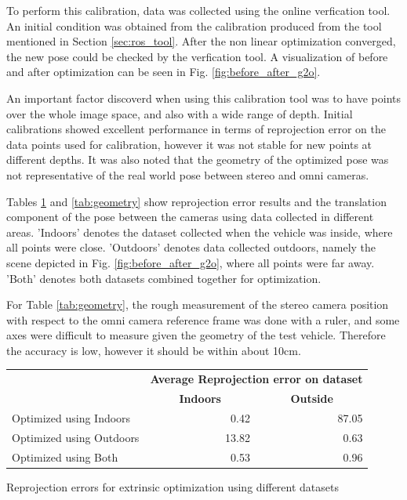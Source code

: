 To perform this calibration, data was collected using the online verfication tool.  An initial condition was obtained from the calibration produced from the tool mentioned in Section \ref{sec:ros_tool}.  After the non linear optimization converged, the new pose could be checked by the verfication tool.  A visualization of before and after optimization can be seen in Fig. \ref{fig:before_after_g2o}. 

An important factor discoverd when using this calibration tool was to have points over the whole image space, and also with a wide range of depth.  Initial calibrations showed excellent performance in terms of reprojection error on the data points used for calibration, however it was not stable for new points at different depths.  It was also noted that the geometry of the optimized pose was not representative of the real world pose between stereo and omni cameras.  

Tables \ref{tab:reprojection_error} and \ref{tab:geometry} show reprojection error results and the translation component of the pose between the cameras using data collected in different areas. 'Indoors' denotes the dataset collected when the vehicle was inside, where all points were close. 'Outdoors' denotes data collected outdoors, namely the scene depicted in Fig. \ref{fig:before_after_g2o}, where all points were far away.  'Both' denotes both datasets combined together for optimization.

For Table \ref{tab:geometry}, the rough measurement of the stereo camera position with respect to the omni camera reference frame was done with a ruler, and some axes were difficult to measure given the geometry of the test vehicle.  Therefore the accuracy is low, however it should be within about 10cm.

\begin{table}[H]
   \begin{tabular}{ p{6cm} r r }
    \toprule
    & \multicolumn{2}{r}{\bf{Average Reprojection error on dataset}}  \\
    & \multicolumn{1}{c}{\hspace*{2cm}\bf{Indoors}} & \multicolumn{1}{c}{\hspace*{2cm}\bf{Outside}} \\
    \midrule
    Optimized using Indoors  & 0.42  & 87.05 \\
    Optimized using Outdoors & 13.82 & 0.63 \\
    Optimized using Both     & 0.53  & 0.96 \\ 
    \bottomrule
    \end{tabular}
     {Reprojection errors for extrinsic optimization using different datasets} 
  \label{tab:reprojection_error}
\end{table}

